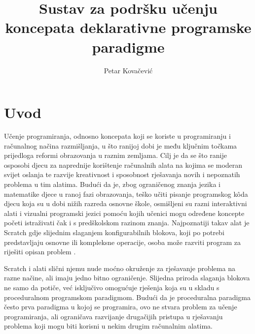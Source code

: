 \documentclass[times, utf8, diplomski, numeric]{fer}
\begin{document}

\title{Sustav za podršku učenju koncepata deklarativne programske paradigme}

\author{Petar Kovačević}

\maketitle



\zahvala{}

\tableofcontents



\chapter{Uvod}

Učenje programiranja, odnosno koncepata koji se koriste u programiranju i računalnog načina razmišljanja, u što ranijoj dobi je među ključnim točkama prijedloga reformi obrazovanja u raznim zemljama.
Cilj je da se što ranije osposobi djecu za naprednije korištenje računalnih alata na kojima se moderan svijet oslanja te razvije kreativnost i sposobnost rješavanja novih i nepoznatih problema u tim alatima.
Budući da je, zbog ograničenog znanja jezika i matematike djece u ranoj fazi obrazovanja, teško učiti pisanje programskog kôda djecu koja su u dobi nižih razreda osnovne škole, osmišljeni su razni interaktivni alati i vizualni programski jezici pomoću kojih učenici mogu određene koncepte početi istraživati čak i s predškolskom razinom znanja.
Najpoznatiji takav alat je Scratch gdje slijednim slaganjem konfigurabilnih blokova, koji po potrebi predstavljaju osnovne ili kompleksne operacije, osoba može razviti program za riješiti opisan problem \citep{scratch}.

Scratch i alati slični njemu nude moćno okruženje za rješavanje problema na razne načine, ali imaju jedno bitno ograničenje.
Slijedna priroda slaganja blokova ne samo da potiče, već isključivo omogućuje rješenja koja su u skladu s proceduralnom programskom paradigmom.
Budući da je proceduralna paradigma često prva paradigma u kojoj se programira, ovo ne stvara problem za učenje programiranja, ali ograničava razvijanje drugačijih pristupa u rješavanju problema koji mogu biti korisni u nekim drugim računalnim alatima.
\end{document}
